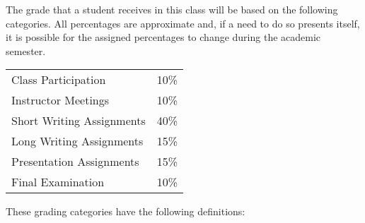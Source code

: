 The grade that a student receives in this class will be based on the following categories. All percentages are
approximate and, if a need to do so presents itself, it is possible for the assigned percentages to change during the
academic semester.

\begin{center}
\begin{tabular}{ll}
Class Participation & 10\% \\
Instructor Meetings & 10\% \\
Short Writing Assignments & 40\% \\
Long Writing Assignments & 15\% \\
Presentation Assignments & 15\% \\
Final Examination & 10\%
\end{tabular}
\end{center}

\noindent
\vspace*{-.1in}
These grading categories have the following definitions:

